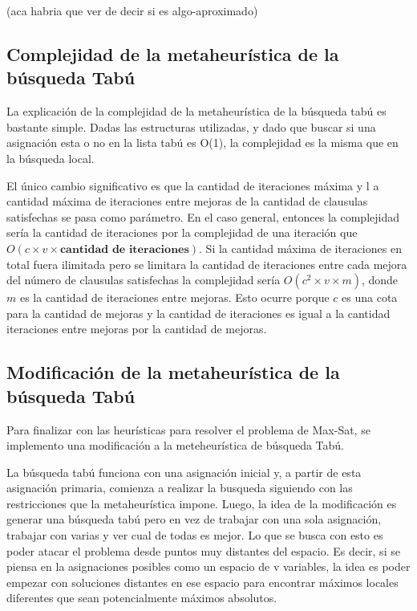 \documentclass[a4paper,10pt]{article}
\begin{document}
(aca habria que ver de decir si es algo-aproximado)

\subsection*{Complejidad de la metaheur\'istica de la b\'usqueda Tab\'u}

La explicaci\'on de la complejidad de la metaheur\'istica de la b\'usqueda tab\'u es bastante simple. Dadas las estructuras utilizadas, y dado que buscar si una asignaci\'on esta o no en la lista tab\'u es O(1), la complejidad es la misma que en la b\'usqueda local.

El \'unico cambio significativo es que la cantidad de iteraciones m\'axima y l
a cantidad máxima de iteraciones entre mejoras de la cantidad de clausulas
satisfechas se pasa como par\'ametro. En el caso general,
entonces la complejidad ser\'ia la cantidad de iteraciones por la complejidad de
una iteraci\'on que$ O\left( c \times v \times \textbf{cantidad de iteraciones}
\right)$.
Si la cantidad máxima de iteraciones en total fuera ilimitada pero se
limitara la cantidad de iteraciones entre cada mejora del número de clausulas
satisfechas la complejidad sería $O\left( c^2 \times v \times m \right)$, donde
$m$ es la cantidad de iteraciones entre mejoras. Esto ocurre porque $c$ es una
cota para la cantidad de mejoras y la cantidad de iteraciones es igual a la
cantidad iteraciones entre mejoras por la cantidad de mejoras.


\subsection*{Modificaci\'on de la metaheur\'istica de la b\'usqueda Tab\'u}

Para finalizar con las heur\'isticas para resolver el problema de Max-Sat, se implemento una modificaci\'on a la meteheur\'istica de b\'usqueda Tab\'u.

La b\'usqueda tab\'u funciona con una asignaci\'on inicial y, a partir de esta asignaci\'on primaria, comienza a realizar la busqueda siguiendo con las restricciones que la metaheur\'istica impone. Luego, la idea de la modificaci\'on es generar una b\'usqueda tab\'u pero en vez de trabajar con una sola asignaci\'on, trabajar con varias y ver cual de todas es mejor. Lo que se busca con esto es poder atacar el problema desde puntos muy distantes del espacio. Es decir, si se piensa en la asignaciones posibles como un espacio de v variables, la idea es poder empezar con soluciones distantes en ese espacio para encontrar m\'aximos locales diferentes que sean potencialmente m\'aximos absolutos.
\end{document}
